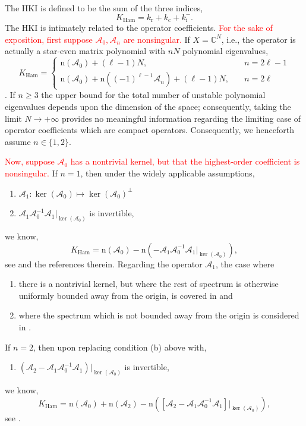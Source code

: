 \documentclass[review,onefignum,onetabnum]{siamart171218}
\newcommand{\C}{\mathbb{C}}
\def\Ham{\mathop\mathrm{Ham}\nolimits}
\def\ker{\mathop\mathrm{ker}\nolimits}
\newcommand{\rmc}{\mathrm{c}}
\newcommand{\rmi}{\mathrm{i}}
\newcommand{\rmn}{\mathrm{n}}
\newcommand{\rmr}{\mathrm{r}}
\newcommand{\calA}{\mathcal{A}}
\newcommand{\revised}[1]{ \textcolor{red}{#1} }
\begin{document}
The HKI is defined to be the sum of the three indices,
\[
K_{\Ham}=k_\rmr+k_\rmc+k_\rmi^-.
\]
The HKI is intimately related to the operator coefficients.
\revised{
For the sake of exposition, first suppose $\calA_0,\calA_n$ are
nonsingular.
}
If $X=\C^N$, i.e., the operator is actually a star-even matrix polynomial with $nN$
polynomial eigenvalues,
\[
K_{\Ham}=\begin{cases}
\rmn(\calA_0)+(\ell-1)N,\quad&n=2\ell-1\\
\rmn(\calA_0)+\rmn\left((-1)^{\ell-1}\calA_{n}\right)+(\ell-1)N,\quad&n=2\ell
\end{cases}
\]
\cite[Theorem~3.4]{kapitula:iif13}. If $n\ge3$ the upper bound for the total
number of unstable polynomial eigenvalues depends upon the dimension of the
space; consequently, taking the limit $N\to+\infty$ provides no meaningful
information regarding the limiting case of operator coefficients which are
compact operators. Consequently, we henceforth assume $n\in\{1,2\}$.

\revised{
Now, suppose $\calA_0$ has a nontrivial kernel, but that the highest-order coefficient is nonsingular.
}
If $n=1$, then under the widely
applicable assumptions,
\begin{enumerate}
\item $\displaystyle{\calA_1:\ker(\calA_0)\mapsto\ker(\calA_0)^\perp}$
\item $\displaystyle{\calA_1\calA_0^{-1}\calA_1|_{\ker(\calA_0)}}$ is invertible,
\end{enumerate}
we know,
\begin{equation}\label{e:11}
K_{\Ham}=\rmn(\calA_0)-\rmn\left(-\calA_1\calA_0^{-1}\calA_1|_{\ker(\calA_0)}\right),
\end{equation}
see \cite{haragus:ots08,pelinovsky:ilf05} and the references therein. Regarding the operator $\calA_1$, the case where
\begin{enumerate}
  \item there is a nontrivial kernel, but where the rest of spectrum is otherwise
uniformly bounded away from the origin, is covered in
\cite{deconinck:ots15,kapitula:sif12} and
\cite[Chapter~5.3]{kapitula:sad13}
  \item where the spectrum
which is not bounded away from the origin is considered in
\cite{kapitula:ahk14,pelinovsky:sso14}.
\end{enumerate}
If $n=2$, then upon replacing condition (b) above with,
\begin{enumerate}\addtocounter{enumi}{1}
\item
    $\displaystyle{\left(\calA_2-\calA_1\calA_0^{-1}\calA_1\right)|_{\ker(\calA_0)}}$
    is invertible,
\end{enumerate}
we know,
\begin{equation}\label{e:12}
K_{\Ham}=\rmn(\calA_0)+\rmn(\calA_2)-
\rmn\left(\left[\calA_2-\calA_1\calA_0^{-1}\calA_1\right]|_{\ker(\calA_0)}\right),
\end{equation}
see \cite{bronski:aii14}.
\end{document}
